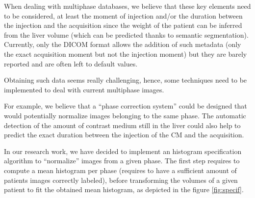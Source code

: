 When dealing with multiphase databases, we believe that these key
elements need to be considered, at least the moment of injection and/or
the duration between the injection and the acquisition since the weight
of the patient can be inferred from the liver volume (which can be
predicted thanks to semantic segmentation). Currently, only the DICOM
format allows the addition of such metadata (only the exact acquisition
moment but not the injection moment) but they are barely reported and
are often left to default values.

Obtaining such data seems really challenging, hence, some techniques
need to be implemented to deal with current multiphase images.

For example, we believe that a ``phase correction system'' could be
designed that would potentially normalize images belonging to the same
phase. The automatic detection of the amount of contrast medium still in
the liver could also help to predict the exact duration between the
injection of the CM and the acquisition.

In our research work, we have decided to implement an histogram
specification algorithm to ``normalize'' images from a given phase. The
first step requires to compute a mean histogram per phase (requires to
have a sufficient amount of patients images correctly labeled), before
transforming the volumes of a given patient to fit the obtained mean
histogram, as depicted in the figure \ref{fig:specif}.

